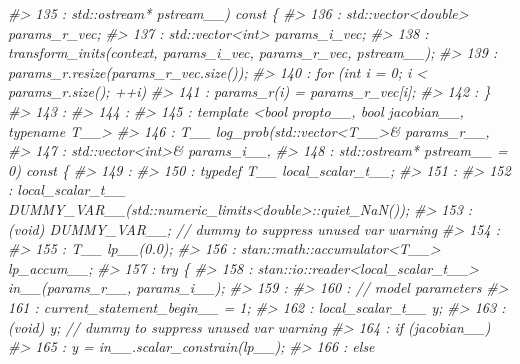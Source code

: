 \documentclass[
  10pt,
  italian,
  a4paper,
  extrafontsizes,onecolumn,openright
  ]{memoir}
\newenvironment{Shaded}{\begin{snugshade}}{\end{snugshade}}
\newcommand{\CommentTok}[1]{\textcolor[rgb]{0.56,0.35,0.01}{\textit{#1}}}
\begin{document}
\begin{Shaded}
\begin{Highlighting}[]
\CommentTok{\#\textgreater{}  135 :                          std::ostream* pstream\_\_) const \{}
\CommentTok{\#\textgreater{}  136 :       std::vector\textless{}double\textgreater{} params\_r\_vec;}
\CommentTok{\#\textgreater{}  137 :       std::vector\textless{}int\textgreater{} params\_i\_vec;}
\CommentTok{\#\textgreater{}  138 :       transform\_inits(context, params\_i\_vec, params\_r\_vec, pstream\_\_);}
\CommentTok{\#\textgreater{}  139 :       params\_r.resize(params\_r\_vec.size());}
\CommentTok{\#\textgreater{}  140 :       for (int i = 0; i \textless{} params\_r.size(); ++i)}
\CommentTok{\#\textgreater{}  141 :         params\_r(i) = params\_r\_vec[i];}
\CommentTok{\#\textgreater{}  142 :     \}}
\CommentTok{\#\textgreater{}  143 : }
\CommentTok{\#\textgreater{}  144 : }
\CommentTok{\#\textgreater{}  145 :     template \textless{}bool propto\_\_, bool jacobian\_\_, typename T\_\_\textgreater{}}
\CommentTok{\#\textgreater{}  146 :     T\_\_ log\_prob(std::vector\textless{}T\_\_\textgreater{}\& params\_r\_\_,}
\CommentTok{\#\textgreater{}  147 :                  std::vector\textless{}int\textgreater{}\& params\_i\_\_,}
\CommentTok{\#\textgreater{}  148 :                  std::ostream* pstream\_\_ = 0) const \{}
\CommentTok{\#\textgreater{}  149 : }
\CommentTok{\#\textgreater{}  150 :         typedef T\_\_ local\_scalar\_t\_\_;}
\CommentTok{\#\textgreater{}  151 : }
\CommentTok{\#\textgreater{}  152 :         local\_scalar\_t\_\_ DUMMY\_VAR\_\_(std::numeric\_limits\textless{}double\textgreater{}::quiet\_NaN());}
\CommentTok{\#\textgreater{}  153 :         (void) DUMMY\_VAR\_\_;  // dummy to suppress unused var warning}
\CommentTok{\#\textgreater{}  154 : }
\CommentTok{\#\textgreater{}  155 :         T\_\_ lp\_\_(0.0);}
\CommentTok{\#\textgreater{}  156 :         stan::math::accumulator\textless{}T\_\_\textgreater{} lp\_accum\_\_;}
\CommentTok{\#\textgreater{}  157 :         try \{}
\CommentTok{\#\textgreater{}  158 :             stan::io::reader\textless{}local\_scalar\_t\_\_\textgreater{} in\_\_(params\_r\_\_, params\_i\_\_);}
\CommentTok{\#\textgreater{}  159 : }
\CommentTok{\#\textgreater{}  160 :             // model parameters}
\CommentTok{\#\textgreater{}  161 :             current\_statement\_begin\_\_ = 1;}
\CommentTok{\#\textgreater{}  162 :             local\_scalar\_t\_\_ y;}
\CommentTok{\#\textgreater{}  163 :             (void) y;  // dummy to suppress unused var warning}
\CommentTok{\#\textgreater{}  164 :             if (jacobian\_\_)}
\CommentTok{\#\textgreater{}  165 :                 y = in\_\_.scalar\_constrain(lp\_\_);}
\CommentTok{\#\textgreater{}  166 :             else}

\end{Highlighting}
\end{Shaded}
\end{document}
